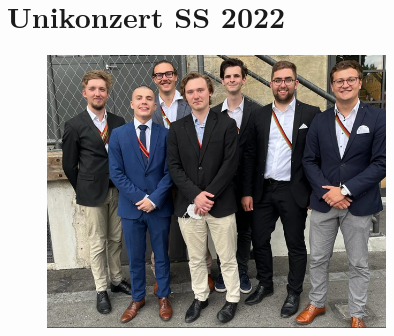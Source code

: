 \section{Unikonzert SS 2022}


\begin{figure}[h]
    \centering 
    \includegraphics[width=0.8\textwidth]{./Bilder/1.0_unikonzert/1.unikonzert.png}
    \caption{}
\end{figure}


